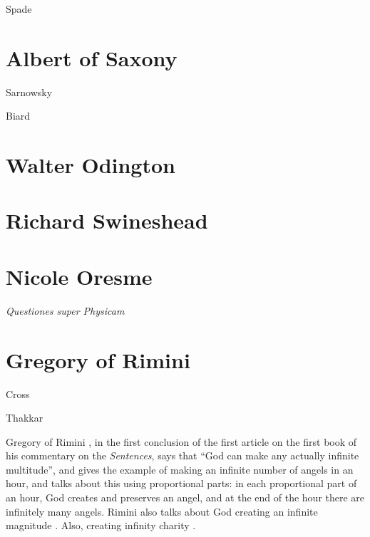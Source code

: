 \documentclass{amsart}
\theoremstyle{definition}
\begin{document}
Spade \cite[pp.~74--75, 117--123]{spade}

\section{Albert of Saxony}
Sarnowsky \cite{sarnowsky}

Biard \cite{saxe}

\section{Walter Odington}

\section{Richard Swineshead}

\section{Nicole Oresme}
{\em Questiones super Physicam} \cite{oresme2013}


\section{Gregory of Rimini}
Cross \cite{rimini}

Thakkar \cite{thakkar}

Gregory of Rimini  \cite[p.~441]{riminiIII}, in the first conclusion of the first article on the first book of his commentary on the {\em Sentences},
says that ``God can make any actually infinite multitude'', and gives the example
of making an infinite number of angels in an hour, and talks about this using proportional parts: in each proportional part of an
hour, God creates and preserves an angel, and at the end of the hour there are infinitely many angels. Rimini also talks about God
creating an infinite magnitude \cite[p.~445]{riminiIII}. Also, creating infinity charity \cite[pp.~446--447]{riminiIII}.
\end{document}
